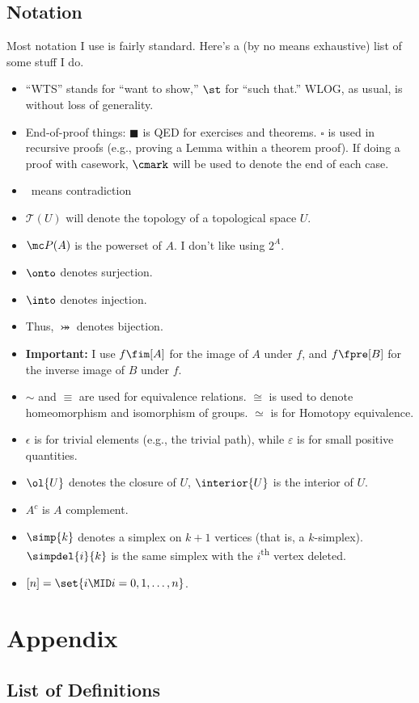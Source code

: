 \documentclass{fkbook}
\begin{document}
\section*{Notation}
Most notation I use is fairly standard. Here's a (by no means exhaustive) list
of some stuff I do.
\begin{itemize}
  \item ``WTS'' stands for ``want to show,'' $\st$ for ``such that.'' WLOG, as
    usual, is without loss of generality.
  \item End-of-proof things: $\blacksquare$ is QED for exercises and theorems.
    $\square$ is used in recursive proofs (e.g., proving a Lemma within a
    theorem proof). If doing a proof with casework, $\cmark$ will be used to
    denote the end of each case.
  \item \contra\ means contradiction
  \item $\mathscr{T}(U)$ will denote the topology of a topological space $U$.
  \item $\mc P(A)$ is the powerset of $A$. I don't like using $2^A$.
  \item $\onto$ denotes surjection.
  \item $\into$ denotes injection.
  \item Thus, $\bij$ denotes bijection.
  \item \textbf{Important:} I use $f\fim[A]$ for the image of $A$ under $f$, and
    $f\fpre[B]$ for the inverse image of $B$ under $f$.
  \item $\sim$ and $\equiv$ are used for equivalence relations. $\cong$ is used
    to denote homeomorphism and isomorphism of groups. $\simeq$ is for Homotopy
    equivalence.
  \item $\epsilon$ is for trivial elements (e.g., the trivial path), while
    $\varepsilon$ is for small positive quantities.
  \item $\ol{U}$ denotes the closure of $U$, $\interior{U}$ is the interior of
    $U$.
  \item $A^c$ is $A$ complement.
  \item $\simp{k}$ denotes a simplex on $k+1$ vertices (that is, a $k$-simplex).
    $\simpdel{i}{k}$ is the same simplex with the $i$\textsuperscript{th} vertex
    deleted.
  \item $[n] = \set{i \MID i = 0,1,\ldots, n}$.
\end{itemize}

\mainmatter

\pagestyle{main}






\chapter{Appendix}
\section{List of Definitions}
\listofdefinitions
\end{document}
